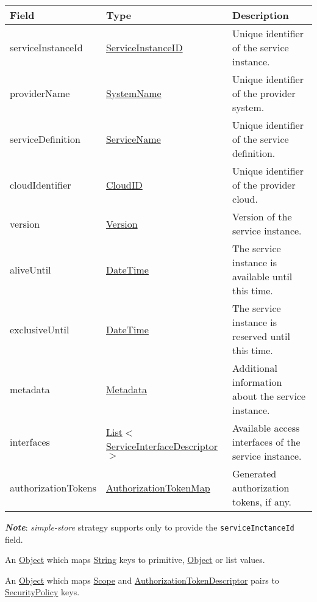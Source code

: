 \documentclass[a4paper]{arrowhead}
\newcommand{\pref}[1]{{\textcolor{ArrowheadGrey}{\hyperref[sec:model:primitives:#1]{#1}}}}
\begin{document}

\begin{table}[ht!]
\begin{tabularx}{\textwidth}{| p{3cm} | p{5.1cm} | X |} \hline
\rowcolor{gray!33} Field & Type & Description \\ \hline
serviceInstanceId & \pref{ServiceInstanceID} & Unique identifier of the service instance. \\ \hline
providerName & \pref{SystemName} & Unique identifier of the provider system. \\ \hline
serviceDefinition & \pref{ServiceName} & Unique identifier of the service definition. \\ \hline
cloudIdentifier & \pref{CloudID} & Unique identifier of the provider cloud. \\ \hline
version & \pref{Version} & Version of the service instance. \\ \hline
aliveUntil & \pref{DateTime} & The service instance is available until this time. \\ \hline
exclusiveUntil & \pref{DateTime} & The service instance is reserved until this time. \\ \hline
metadata & \hyperref[sec:model:Metadata]{Metadata} & Additional information about the service instance. \\ \hline
interfaces & \pref{List}$<$\hyperref[sec:model:ServiceInterfaceDescriptor]{ServiceInterfaceDescriptor}$>$ & Available access interfaces of the service instance. \\ \hline
authorizationTokens & \hyperref[sec:model:AuthorizationTokenMap]{AuthorizationTokenMap} & Generated authorization tokens, if any. \\ \hline
\end{tabularx}
\end{table}

\textbf{\textit{Note}}: \textit{simple-store} strategy supports only to provide the \texttt{serviceInctanceId} field. 


An \pref{Object} which maps \pref{String} keys to primitive, \pref{Object} or list values.

\clearpage


An \pref{Object} which maps \hyperref[sec:model:Scope]{Scope} and \hyperref[sec:model:AuthorizationTokenDescriptor]{AuthorizationTokenDescriptor} pairs to  \pref{SecurityPolicy} keys.
\end{document}
